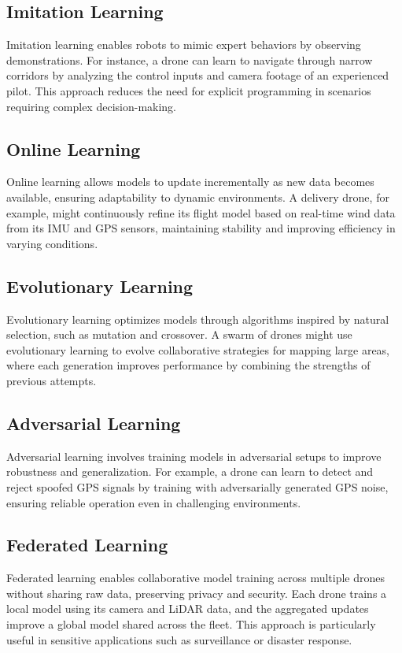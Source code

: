 \subsection{Imitation Learning}
Imitation learning enables robots to mimic expert behaviors by observing demonstrations. For instance, a drone can learn to navigate through narrow corridors by analyzing the control inputs and camera footage of an experienced pilot. This approach reduces the need for explicit programming in scenarios requiring complex decision-making. \cite{argall-2009-imitation-learning}

\subsection{Online Learning}
Online learning allows models to update incrementally as new data becomes available, ensuring adaptability to dynamic environments. A delivery drone, for example, might continuously refine its flight model based on real-time wind data from its IMU and GPS sensors, maintaining stability and improving efficiency in varying conditions. \cite{hoi-2018-online-learning}

\subsection{Evolutionary Learning}
Evolutionary learning optimizes models through algorithms inspired by natural selection, such as mutation and crossover. A swarm of drones might use evolutionary learning to evolve collaborative strategies for mapping large areas, where each generation improves performance by combining the strengths of previous attempts. \cite{goldberg-1989-genetic-algorithms}

\subsection{Adversarial Learning}
Adversarial learning involves training models in adversarial setups to improve robustness and generalization. For example, a drone can learn to detect and reject spoofed GPS signals by training with adversarially generated GPS noise, ensuring reliable operation even in challenging environments. \cite{goodfellow-2014-gan}

\subsection{Federated Learning}
Federated learning enables collaborative model training across multiple drones without sharing raw data, preserving privacy and security. Each drone trains a local model using its camera and LiDAR data, and the aggregated updates improve a global model shared across the fleet. This approach is particularly useful in sensitive applications such as surveillance or disaster response. \cite{mcmahan-2017-federated-learning}

